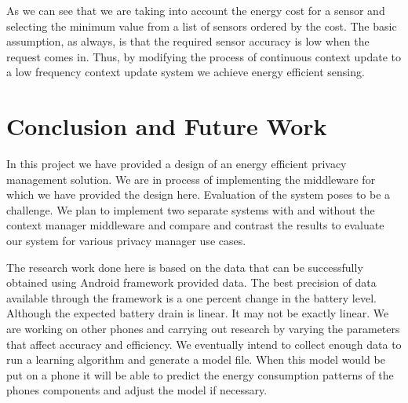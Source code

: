 \documentclass{ubicomp2013}
\begin{document}

As we can see that we are taking into account the energy cost for a sensor and selecting the minimum value from a list of sensors ordered by the cost. The basic assumption, as always, is that the required sensor accuracy is low when the request comes in. Thus, by modifying the process of continuous context update to a low frequency context update system we achieve energy efficient sensing. 

\section{Conclusion and Future Work}

In this project we have provided a design of an energy efficient privacy management solution. We are in process of implementing the middleware for which we have provided the design here. Evaluation of the system poses to be a challenge. We plan to implement two separate systems with and without the context manager middleware and compare and contrast the results to evaluate our system for various privacy manager use cases.

The research work done here is based on the data that can be successfully obtained using Android framework provided data. The best precision of data available through the framework is a one percent change in the battery level. Although the expected battery drain is linear. It may not be exactly linear. We are working on other phones and carrying out research by varying the parameters that affect accuracy and efficiency. We eventually intend to collect enough data to run a learning algorithm and generate a model file. When this model would be put on a phone it will be able to predict the energy consumption patterns of the phones components and adjust the model if necessary.
\end{document}
